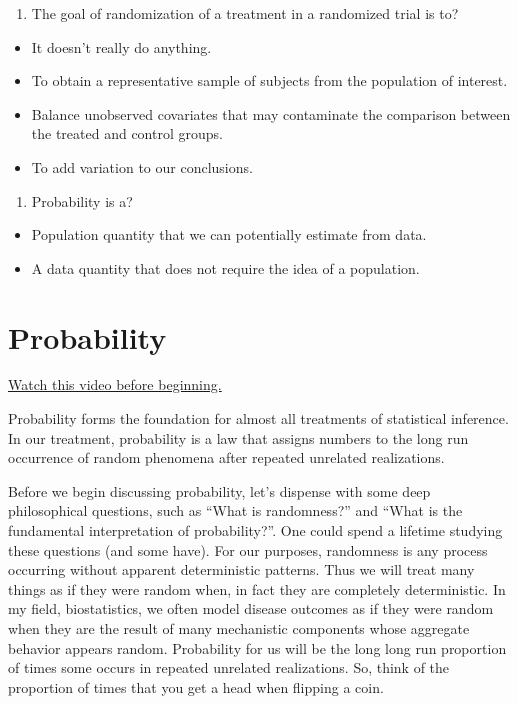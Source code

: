 \documentclass[]{article}
\begin{document}
\begin{enumerate}
\def\labelenumi{\arabic{enumi}.}
\setcounter{enumi}{1}
\itemsep1pt\parskip0pt
\item
  The goal of randomization of a treatment in a randomized trial is to?
\end{enumerate}

\begin{itemize}
\itemsep1pt\parskip0pt
\item
  It doesn't really do anything.
\item
  To obtain a representative sample of subjects from the population of
  interest.
\item
  Balance unobserved covariates that may contaminate the comparison
  between the treated and control groups.
\item
  To add variation to our conclusions.
\end{itemize}

\begin{enumerate}
\def\labelenumi{\arabic{enumi}.}
\setcounter{enumi}{2}
\itemsep1pt\parskip0pt
\item
  Probability is a?
\end{enumerate}

\begin{itemize}
\itemsep1pt\parskip0pt
\item
  Population quantity that we can potentially estimate from data.
\item
  A data quantity that does not require the idea of a population.
\end{itemize}

\newpage

\section{Probability}\label{probability}

\href{http://youtu.be/oTERv_vrmJM?list=PLpl-gQkQivXiBmGyzLrUjzsblmQsLtkzJ}{Watch
this video before beginning.}

Probability forms the foundation for almost all treatments of
statistical inference. In our treatment, probability is a law that
assigns numbers to the long run occurrence of random phenomena after
repeated unrelated realizations.

Before we begin discussing probability, let's dispense with some deep
philosophical questions, such as ``What is randomness?'' and ``What is
the fundamental interpretation of probability?''. One could spend a
lifetime studying these questions (and some have). For our purposes,
randomness is any process occurring without apparent deterministic
patterns. Thus we will treat many things as if they were random when, in
fact they are completely deterministic. In my field, biostatistics, we
often model disease outcomes as if they were random when they are the
result of many mechanistic components whose aggregate behavior appears
random. Probability for us will be the long long run proportion of times
some occurs in repeated unrelated realizations. So, think of the
proportion of times that you get a head when flipping a coin.
\end{document}
